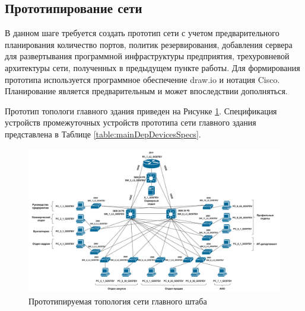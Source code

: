 \documentclass[14pt, a4paper]{extarticle}
\numberwithin{equation}{section}
\begin{document}
\newpage
\subsection{Прототипирование сети}
В данном шаге требуется создать прототип сети с учетом 
предварительного планирования количество портов, 
политик резервирования, добавления сервера для 
развертывания программной инфраструктуры предприятия, 
трехуровневой архитектуры сети, полученных в предыдущем 
пункте работы. 
Для формирования прототипа используется программное 
обеспечение draw.io и нотация Cisco. 
Планирование является предварительным и может впоследствии дополняться.

Прототип топологи главного здания приведен на Рисунке \ref{fig:mainDepTopo}.
Спецификация устройств промежуточных устройств прототипа сети главного здания представлена в Таблице \ref{table:mainDepDevicesSpecs}.



\begin{landscape}
\begin{figure}[H]
        \centering
        \includegraphics[scale=0.2]{topo_mainDep.png}
        \caption{Прототипируемая топология сети главного штаба}
        \label{fig:mainDepTopo}
\end{figure}
\end{landscape}
\end{document}
